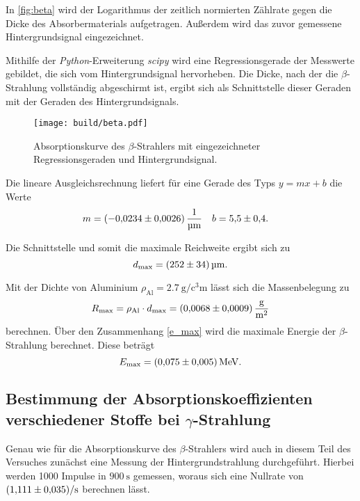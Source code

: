 In \autoref{fig:beta} wird der Logarithmus der zeitlich normierten Zählrate gegen die Dicke des Absorbermaterials 
aufgetragen. Außerdem wird das zuvor gemessene Hintergrundsignal eingezeichnet.

Mithilfe der \textit{Python}-Erweiterung \textit{scipy} \cite{scipy} wird eine Regressionsgerade der Messwerte gebildet, die sich
vom Hintergrundsignal hervorheben.
Die Dicke, nach der die $\beta$-Strahlung vollständig abgeschirmt ist, ergibt sich als Schnittstelle dieser Geraden mit der
Geraden des Hintergrundsignals.

\begin{figure}[H]
    \centering
    \texttt{[image: build/beta.pdf]}
    \caption{Absorptionskurve des $\beta$-Strahlers mit eingezeichneter Regressionsgeraden und Hintergrundsignal.}
    \label{fig:beta}
\end{figure}

Die lineare Ausgleichsrechnung liefert für eine Gerade des Typs $y = mx + b$ die Werte
\begin{align*}
    m &= \qty{-0.0234+-0.0026}{\per\micro\metre} & b &= \num{5.5+-0.4}.
\end{align*}

Die Schnittstelle und somit die maximale Reichweite ergibt sich zu
\begin{equation*}
    d_{\text{max}} = \qty{252+-34}{\micro\metre}.
\end{equation*}

Mit der Dichte von Aluminium $\rho_{\text{Al}} = \qty{2.7}{\gram\per\cubic\centi\metre}$ \cite{czichos} lässt sich die Massenbelegung
zu
\begin{equation*}
    R_{\text{max}} = \rho_{\text{Al}} \cdot d_{\text{max}} = \qty{0.0068+-0.0009}{\gram\per\metre\squared}
\end{equation*}
berechnen.
Über den Zusammenhang \eqref{e_max} wird die maximale Energie der $\beta$-Strahlung berechnet. Diese beträgt
\begin{equation*}
    E_{\text{max}} = \qty{0.075+-0.005}{\mega\electronvolt}.
\end{equation*}

\subsection{\texorpdfstring{Bestimmung der Absorptionskoeffizienten verschiedener Stoffe bei $\gamma$-Strahlung}
{Bestimmung der Absorptionskoeffizienten verschiedener Stoffe bei Gamma-Strahlung}}
Genau wie für die Absorptionskurve des $\beta$-Strahlers wird auch in diesem Teil des Versuches zunächst eine Messung
der Hintergrundstrahlung durchgeführt. Hierbei werden 1000 Impulse in $\qty{900}{\second}$ gemessen, woraus sich eine 
Nullrate von $\qty{1.111+-0.035}{\per\second}$ berechnen lässt.

